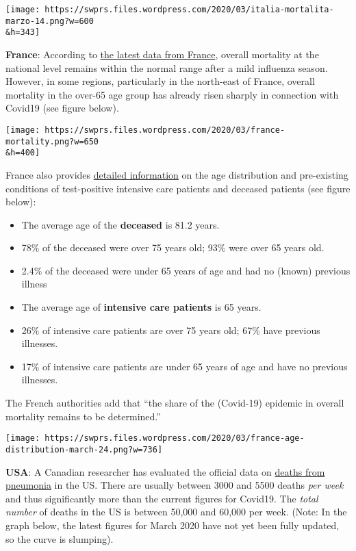 \texttt{[image: https://swprs.files.wordpress.com/2020/03/italia-mortalita-marzo-14.png?w=600\\\&h=343]}

\textbf{France}: According to
\href{https://www.santepubliquefrance.fr/maladies-et-traumatismes/maladies-et-infections-respiratoires/infection-a-coronavirus/documents/bulletin-national/covid-19-point-epidemiologique-du-24-mars-2020}{the
latest data from France}, overall mortality at the national level
remains within the normal range after a mild influenza season. However,
in some regions, particularly in the north-east of France, overall
mortality in the over-65 age group has already risen sharply in
connection with Covid19 (see figure below).

\texttt{[image: https://swprs.files.wordpress.com/2020/03/france-mortality.png?w=650\\\&h=400]}

France also provides
\href{https://www.santepubliquefrance.fr/maladies-et-traumatismes/maladies-et-infections-respiratoires/infection-a-coronavirus/documents/bulletin-national/covid-19-point-epidemiologique-du-24-mars-2020}{detailed
information} on the age distribution and pre-existing conditions of
test-positive intensive care patients and deceased patients (see figure
below):

\begin{itemize}
\tightlist
\item
  The average age of the \textbf{deceased} is 81.2 years.
\item
  78\% of the deceased were over 75 years old; 93\% were over 65 years
  old.
\item
  2.4\% of the deceased were under 65 years of age and had no (known)
  previous illness
\item
  The average age of \textbf{intensive care patients} is 65 years.
\item
  26\% of intensive care patients are over 75 years old; 67\% have
  previous illnesses.
\item
  17\% of intensive care patients are under 65 years of age and have no
  previous illnesses.
\end{itemize}

The French authorities add that ``the share of the (Covid-19) epidemic
in overall mortality remains to be determined.''

\texttt{[image: https://swprs.files.wordpress.com/2020/03/france-age-distribution-march-24.png?w=736]}

\textbf{USA}: A Canadian researcher has evaluated the official data on
\href{https://gis.cdc.gov/grasp/fluview/mortality.html}{deaths from
pneumonia} in the US. There are usually between 3000 and 5500 deaths
\emph{per week} and thus significantly more than the current figures for
Covid19. The \emph{total number} of deaths in the US is between 50,000
and 60,000 per week. (Note: In the graph below, the latest figures for
March 2020 have not yet been fully updated, so the curve is slumping).

